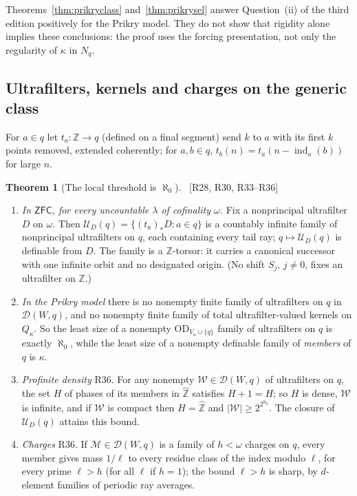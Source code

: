 \documentclass[11pt,letterpaper]{article}
\theoremstyle{definition}
\newtheorem{theorem}[definition]{Theorem}
\numberwithin{equation}{section}
\newcommand{\ZFC}{\mathsf{ZFC}}
\newcommand{\OD}{\mathrm{OD}}
\newcommand{\ch}{\operatorname{ind}}
\newcommand{\src}[1]{\unskip\ {\normalfont\small\sffamily\color{Olive}[#1]}\ }
\newcommand{\R}[1]{\textsf{R#1}}
\begin{document}
Theorems~\ref{thm:prikryclass} and~\ref{thm:prikrysel} answer Question~(ii) of the third edition positively for the Prikry model. They do not show that rigidity alone implies these conclusions: the proof uses the forcing presentation, not only the regularity of $\kappa$ in $N_q$.

\subsection{Ultrafilters, kernels and charges on the generic class}

For $a\in q$ let $t_a:\mathbb Z\to q$ (defined on a final segment) send $k$ to $a$ with its first $k$ points removed, extended coherently; for $a,b\in q$, $t_b(n)=t_a(n-\ch_a(b))$ for large $n$.

\begin{theorem}[The local threshold is $\aleph_0$]\label{thm:ufthreshold}\src{R28, R30, R33--R36}
\begin{enumerate}
\item \emph{In $\ZFC$, for every uncountable $\lambda$ of cofinality $\omega$.} Fix a nonprincipal ultrafilter $D$ on $\omega$. Then $\mathcal U_D(q)=\{(t_a)_*D:a\in q\}$ is a countably infinite family of nonprincipal ultrafilters on $q$, each containing every tail ray; $q\mapsto\mathcal U_D(q)$ is definable from $D$. The family is a $\mathbb Z$-torsor: it carries a canonical successor with one infinite orbit and no designated origin. (No shift $S_j$, $j\ne0$, fixes an ultrafilter on $\mathbb Z$.)
\item \emph{In the Prikry model} there is no nonempty finite family of ultrafilters on $q$ in $\mathcal D(W,q)$, and no nonempty finite family of total ultrafilter-valued kernels on $Q_\kappa$. So the least size of a nonempty $\OD_{V_\kappa\cup\{q\}}$ family of ultrafilters on $q$ is exactly $\aleph_0$, while the least size of a nonempty definable family of \emph{members} of $q$ is $\kappa$.
\item \emph{Profinite density} \R{36}. For any nonempty $\mathcal W\in\mathcal D(W,q)$ of ultrafilters on $q$, the set $H$ of phases of its members in $\widehat{\mathbb Z}$ satisfies $H+1=H$; so $H$ is dense, $\mathcal W$ is infinite, and if $\mathcal W$ is compact then $H=\widehat{\mathbb Z}$ and $|\mathcal W|\ge2^{2^{\aleph_0}}$. The closure of $\mathcal U_D(q)$ attains this bound.
\item \emph{Charges} \R{36}. If $\mathcal M\in\mathcal D(W,q)$ is a family of $h<\omega$ charges on $q$, every member gives mass $1/\ell$ to every residue class of the index modulo $\ell$, for every prime $\ell>h$ (for all $\ell$ if $h=1$); the bound $\ell>h$ is sharp, by $d$-element families of periodic ray averages.
\end{enumerate}
\end{theorem}
\end{document}
